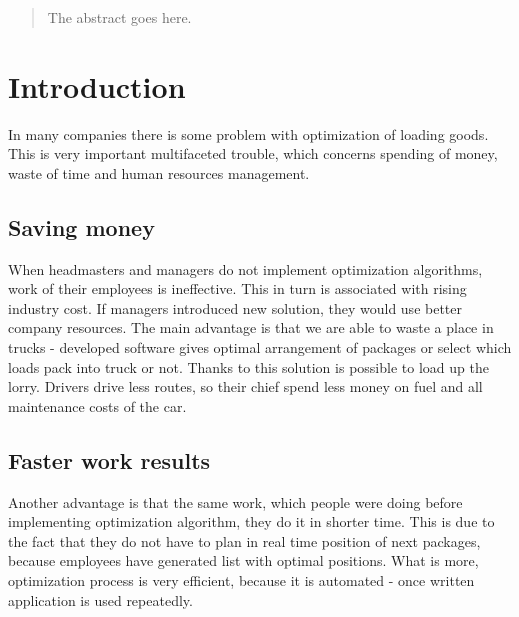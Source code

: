 \documentclass[conference,compsoc]{IEEEtran}
\begin{document}




\maketitle

\begin{abstract}
The abstract goes here.
\end{abstract}





%
\IEEEpeerreviewmaketitle



\section{Introduction}
In many companies there is some problem with optimization of loading goods. This is very important multifaceted trouble, which concerns spending of money, waste of time and human resources management.

\subsection{Saving money}
When headmasters and managers do not implement optimization algorithms, work of their employees is ineffective. This in turn is associated with rising industry cost. If managers introduced new solution, they would use better company resources. %
The main advantage is that we are able to waste a place in trucks - developed software gives optimal arrangement of packages or select which loads pack into truck or not. Thanks to this solution is possible  to load up the lorry. Drivers drive less routes, so their chief spend less money on fuel and all maintenance costs of the car.

\subsection{Faster work results}
Another advantage is that the same work, which people were doing before implementing optimization algorithm, they do it in shorter time. This is due to the fact that they do not have to plan in real time position of next packages, because employees have generated list with optimal positions. What is more, optimization process is very efficient, because it is automated - once written application is used repeatedly.
\end{document}
